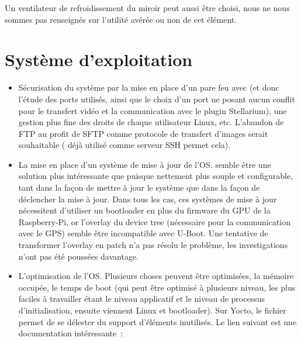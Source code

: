 Un ventilateur de refroidissement du miroir peut aussi être choisi, nous ne nous sommes pas renseignés sur l'utilité avérée ou non de cet élément.

\section{Système d'exploitation}

\begin{itemize}[label=$\bullet$]
	\item Sécurisation du système par la mise en place d'un pare feu avec  (et donc l'étude des ports utilisés, ainsi que le choix d'un port ne posant aucun conflit pour le transfert vidéo et la communication avec le plugin Stellarium), une gestion plus fine des droits de chaque utilisateur Linux, etc. L'abandon de FTP au profit de SFTP comme protocole de transfert d'images serait souhaitable ( déjà utilisé comme serveur SSH permet cela).
	\item La mise en place d'un système de mise à jour de l'OS.  semble être une solution plus intéressante que  puisque nettement plus souple et configurable, tant dans la façon de mettre à jour le système que dans la façon de déclencher la mise à jour. Dans tous les cas, ces systèmes de mise à jour nécessitent d'utiliser un bootloader en plus du firmware du GPU de la Raspberry-Pi, or l'overlay du device tree  (nécessaire pour la communication avec le GPS) semble être incompatible avec U-Boot. Une tentative de transformer l'overlay en patch n'a pas résolu le problème, les investigations n'ont pas été poussées davantage.
	\item L'optimisation de l'OS. Plusieurs choses peuvent être optimisées, la mémoire occupée, le temps de boot (qui peut être optimisé à plusieurs niveau, les plus faciles à travailler étant le niveau applicatif et le niveau de processus d'initialisation, ensuite viennent Linux et bootloader). Sur Yocto, le fichier  permet de se délester du support d'éléments inutilisés. Le lien suivant est une documentation intéressante~:\\{\href{https://embexus.com/2017/05/16/embedded-linux-fast-boot-techniques/}{}}
	\end{itemize}

